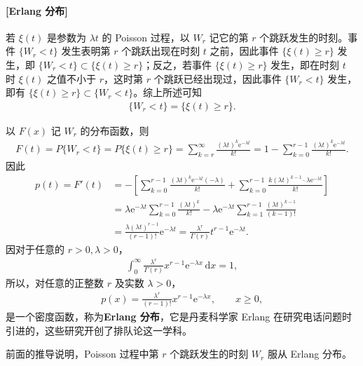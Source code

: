 \documentclass[../../main.tex]{subfiles}
\begin{document}
\paragraph{[Erlang 分布]}若 $\xi(t)$ 是参数为 $\lambda t$ 的 Poisson 过程，以 $W_r$ 记它的第 $r$ 个跳跃发生的时刻。事件 $\{W_r<t\}$ 发生表明第 $r$ 个跳跃出现在时刻 $t$ 之前，因此事件 $\{\xi(t)\geqslant r\}$ 发生，即 $\{W_r<t\}\subset\{\xi(t)\geqslant r\}$；反之，若事件 $\{\xi(t)\geqslant r\}$ 发生，即在时刻 $t$ 时 $\xi(t)$ 之值不小于 $r$，这时第 $r$ 个跳跃已经出现过，因此事件 $\{W_r<t\}$ 发生，即有 $\{\xi(t)\geqslant r\}\subset\{W_r<t\}$。综上所述可知
\begin{align*}\{W_r<t\}=\{\xi(t)\geqslant r\}.\end{align*}

以 $F(x)$ 记 $W_r$ 的分布函数，则
\begin{align}
F(t)=P\{W_r<t\}=P\{\xi(t)\geqslant r\}
=\sum_{k=r}^{\infty}\frac{(\lambda t)^{k}\mathrm{e}^{-\lambda t}}{k!}
=1-\sum_{k=0}^{r-1}\frac{(\lambda t)^{k}\mathrm{e}^{-\lambda t}}{k!}.\label{align:ch03-erlang分布函数}
\end{align}
因此
\begin{align*}
p(t)=F'(t)
&=-\left[\sum_{k=0}^{r-1}\frac{(\lambda t)^{k}\mathrm{e}^{-\lambda t}(-\lambda)}{k!}+\sum_{k=0}^{r-1}\frac{k(\lambda t)^{k-1}\cdot\lambda\mathrm{e}^{-\lambda t}}{k!}\right]\\
&=\lambda\mathrm{e}^{-\lambda t}\sum_{k=0}^{r-1}\frac{(\lambda t)^{k}}{k!}-\lambda\mathrm{e}^{-\lambda t}\sum_{k=1}^{r-1}\frac{(\lambda t)^{k-1}}{(k-1)!}\\
&=\frac{\lambda(\lambda t)^{r-1}}{(r-1)!}\mathrm{e}^{-\lambda t}=\frac{\lambda^{r}}{\Gamma(r)}t^{r-1}\mathrm{e}^{-\lambda t}.
\end{align*}
因对于任意的 $r>0,\lambda>0$，
\begin{align}
\int_{0}^{\infty}\frac{\lambda^{r}}{\Gamma(r)}x^{r-1}\mathrm{e}^{-\lambda x}\,\mathrm{d}x=1,\label{align:ch03-gamma归一}
\end{align}
所以，对任意的正整数 $r$ 及实数 $\lambda>0$，
\begin{align}
p(x)=\frac{\lambda^{r}}{(r-1)!}x^{r-1}\mathrm{e}^{-\lambda x},\qquad x\geqslant 0,\label{align:ch03-erlang密度}
\end{align}
是一个密度函数，称为\textbf{Erlang 分布}，它是丹麦科学家 Erlang 在研究电话问题时引进的，这些研究开创了排队论这一学科。

前面的推导说明，Poisson 过程中第 $r$ 个跳跃发生的时刻 $W_r$ 服从 Erlang 分布。
\end{document}
